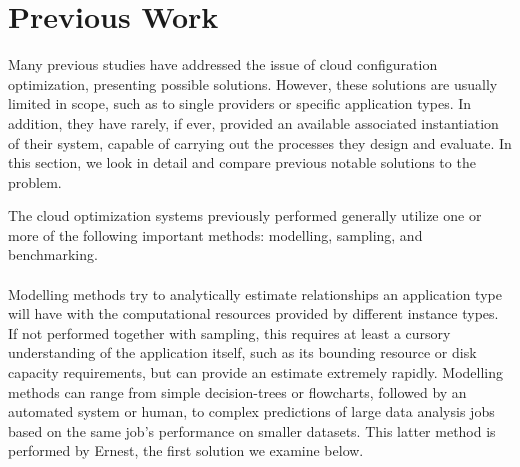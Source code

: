 \documentclass{report}
\begin{document}
\section{Previous Work}
Many previous studies have addressed the issue of cloud configuration optimization, presenting possible solutions. However, these solutions are usually limited in scope, such as to single providers or specific application types. In addition, they have rarely, if ever, provided an available associated instantiation of their system, capable of carrying out the processes they design and evaluate. In this section, we look in detail and compare previous notable solutions to the problem.

The cloud optimization systems previously performed generally utilize one or more of the following important methods: modelling, sampling, and benchmarking. 

\paragraph{}
Modelling methods try to analytically estimate relationships an application type will have with the computational resources provided by different instance types. If not performed together with sampling, this requires at least a cursory understanding of the application itself, such as its bounding resource or disk capacity requirements, but can provide an estimate extremely rapidly. Modelling methods can range from simple decision-trees or flowcharts, followed by an automated system or human, to complex predictions of large data analysis jobs based on the same job's performance on smaller datasets. This latter method is performed by Ernest\cite{Venkataraman2016}, the first solution we examine below.
\end{document}
